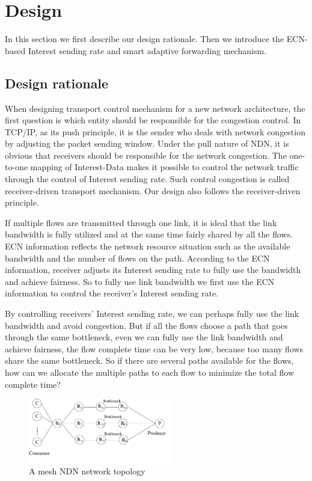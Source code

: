 \section{Design}
In this section we first describe our design rationale. Then we introduce the ECN-based Interest sending rate and smart adaptive forwarding mechanism.
\label{sec:design}
\subsection{Design rationale}
When designing transport control mechanism for a new network architecture, the first question is which entity should be responsible for the congestion control. In TCP/IP, as its push principle, it is the sender who deals with network congestion by adjusting the packet sending window. Under the pull nature of NDN, it is obvious that receivers should be responsible for the network congestion. The one-to-one mapping of Interest-Data makes it possible to control the network traffic through the control of Interest sending rate. Such control congestion is called receiver-driven transport mechanism\cite{Contug}. Our design also follows the receiver-driven principle.

If multiple flows are transmitted through one link, it is ideal that the link bandwidth is fully utilized and at the same time fairly shared by all the flows. ECN information reflects the network resource situation such as the available bandwidth and the number of flows on the path. According to the ECN information, receiver adjusts its Interest sending rate to fully use the bandwidth and achieve fairness. So to fully use link bandwidth we first use the ECN information to control the receiver's Interest sending rate.

By controlling receivers' Interest sending rate, we can perhaps fully use the link bandwidth and avoid congestion. But if all the flows choose a path that goes through the same bottleneck, even we can fully use the link bandwidth and achieve fairness, the flow complete time can be very low, because too many flows share the same bottleneck. So if there are several paths available for the flows, how can we allocate the multiple paths to each flow to minimize the total flow complete time?
\begin{figure}[t]
	\centering
	\includegraphics[width=2.5in]{mesh-topology.pdf}
	\caption{A mesh NDN network topology}
	\label{mesh-topology}
\end{figure}

